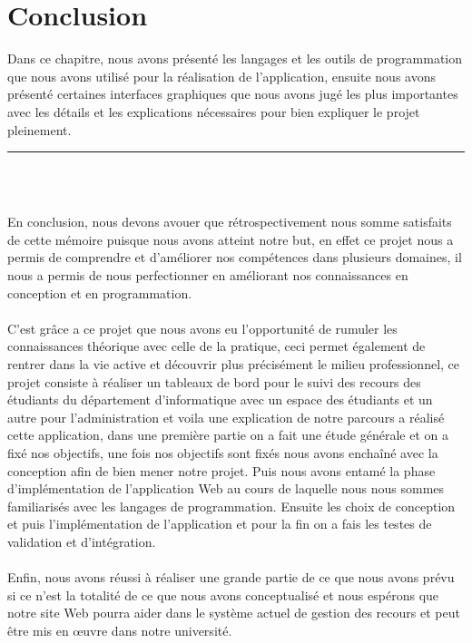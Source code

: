 \documentclass[12pt]{report}
\begin{document}
\section{Conclusion}
\vspace{0.1in}

Dans ce chapitre, nous avons présenté les langages et les outils de programmation que nous avons utilisé pour la réalisation de l'application, ensuite nous avons présenté certaines interfaces graphiques que nous avons jugé les plus importantes avec les détails et les explications nécessaires pour bien expliquer le projet pleinement.

\newpage

\vspace*{-0.2in}

\begin{center}
    {\color{Blue} \rule{5.5in}{1.4mm} }\\
    \vspace{0.1in}
    \scshape{\fontsize{34}{46}{\bfseries{\color{Blue}{Conclusion générale}}}}
    \\
    \vspace{0.5in}
\end{center}

En conclusion, nous devons avouer que rétrospectivement nous somme satisfaits de cette mémoire puisque nous avons atteint notre but, en effet ce projet nous a permis de comprendre et d'améliorer nos compétences dans plusieurs domaines, il nous a permis de nous perfectionner en améliorant nos connaissances en conception et en programmation.
\\\\
C'est grâce a ce projet que nous avons eu l'opportunité de rumuler les connaissances théorique avec celle de la pratique, ceci permet également de rentrer dans la vie active et découvrir plus précisément le milieu professionnel, ce projet consiste à réaliser un tableaux de bord pour le suivi des recours des étudiants du département d’informatique avec un espace des étudiants et un autre pour l’administration et voila une explication de notre parcours a réalisé cette application, dans une première partie on a fait une étude générale et on a fixé nos objectifs, une fois nos objectifs sont fixés nous avons enchaîné avec la conception afin de bien mener notre projet. Puis nous avons entamé la phase d’implémentation de l’application Web au cours de laquelle nous nous sommes familiarisés avec les langages de programmation. Ensuite les choix de conception et puis l'impl\'ementation de l’application et pour la fin on a fais les testes de validation et d'intégration.
\\\\
Enfin, nous avons réussi à réaliser une grande partie de ce que nous avons prévu si ce n'est la totalité de ce que nous avons conceptualisé et nous espérons que notre site Web pourra aider dans le système actuel de gestion des recours et peut être mis en œuvre dans notre université.

\newpage


\def\thispagestyle#1{}
\thispagestyle{empty}
\pagestyle{empty}


\end{document}
